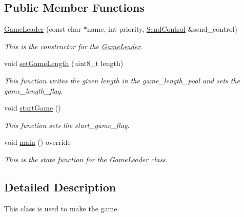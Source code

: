 \subsection*{Public Member Functions}
\begin{DoxyCompactItemize}
\item 
\mbox{\hyperlink{class_game_leader_a37f89b9731c43cb875207ebbbcdcc96f}{Game\+Leader}} (const char $\ast$name, int priority, \mbox{\hyperlink{class_send_control}{Send\+Control}} \&send\+\_\+control)
\begin{DoxyCompactList}\small\item\em This is the constructor for the \mbox{\hyperlink{class_game_leader}{Game\+Leader}}. \end{DoxyCompactList}\item 
\mbox{\label{class_game_leader_a704a13665a65f4528ed3022111c468e2}} 
void \mbox{\hyperlink{class_game_leader_a704a13665a65f4528ed3022111c468e2}{set\+Game\+Length}} (uint8\+\_\+t length)
\begin{DoxyCompactList}\small\item\em This function writes the given length in the game\+\_\+length\+\_\+pool and sets the game\+\_\+length\+\_\+flag. \end{DoxyCompactList}\item 
\mbox{\label{class_game_leader_a42849b606a56928126bc915b56695b38}} 
void \mbox{\hyperlink{class_game_leader_a42849b606a56928126bc915b56695b38}{start\+Game}} ()
\begin{DoxyCompactList}\small\item\em This function sets the start\+\_\+game\+\_\+flag. \end{DoxyCompactList}\item 
void \mbox{\hyperlink{class_game_leader_a83c1a53edf86e4a740c6e4a08f022f36}{main}} () override
\begin{DoxyCompactList}\small\item\em This is the state function for the \mbox{\hyperlink{class_game_leader}{Game\+Leader}} class. \end{DoxyCompactList}\end{DoxyCompactItemize}


\subsection{Detailed Description}
This class is used to make the game. 

